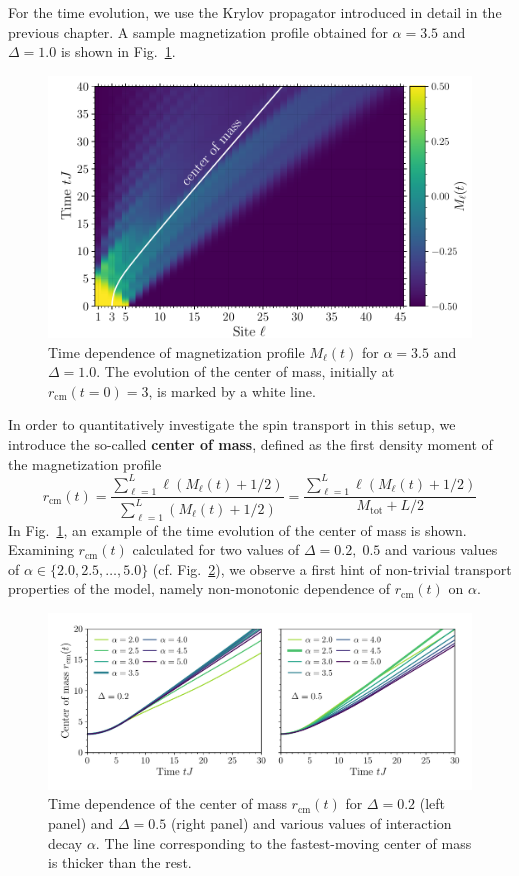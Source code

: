 For the time evolution, we use the Krylov propagator introduced in detail in the previous chapter.
A sample magnetization profile obtained for \(\alpha = 3.5\) and \(\Delta = 1.0\) is shown in
Fig.~\ref{fig:magnetization_profile}.
\begin{figure}[htbp]
  \centering
  \includegraphics[width=0.8\linewidth]{Figures/magnetization.pdf}
  \caption{Time dependence of magnetization profile \(M_{\ell}(t)\) for \(\alpha = 3.5\) and \(\Delta = 1.0\).
    The evolution of the center of mass, initially at \(r_{\text{cm}}(t=0)=3\), is marked by a white line.}
  \label{fig:magnetization_profile}
\end{figure}
In order to quantitatively investigate the spin transport in this setup, we introduce the so-called
\textbf{center of mass}, defined as the first density moment of the magnetization profile
\begin{equation}
  r_{\text{cm}}(t) = \frac{\sum_{\ell=1}^{L} \ell \left(M_{\ell}(t)+1/2\right)}
  {\sum_{\ell=1}^{L} \left(M_{\ell}(t) + 1/2\right)} =
  \frac{\sum_{\ell=1}^{L} \ell \left(M_{\ell}(t)+1/2\right)}
  {M_{\mathrm{tot}} + L/2}
  \label{eq:center_of_mass}
\end{equation}
In Fig.~\ref{fig:magnetization_profile}, an example of the time evolution of the center of mass is shown. Examining \(r_{\text{cm}}(t)\)
calculated for two values of \(\Delta = 0.2,\;0.5\) and various values of \(\alpha \in \{2.0,2.5,\ldots,5.0\}\)
(cf. Fig.~\ref{fig:center_of_mass}), we observe a first hint of non-trivial transport properties of the model, namely
non-monotonic dependence of \(r_{\text{cm}}(t)\) on \(\alpha\).
\begin{figure}[htbp]
  \centering
  \includegraphics[width=0.95\linewidth]{Figures/center_of_mass.pdf}
  \caption{Time dependence of the center of mass \(r_{\text{cm}}(t)\) for \(\Delta = 0.2\) (left panel) and \(\Delta = 0.5\)
    (right panel) and various values of interaction decay \(\alpha\). The line corresponding to the fastest-moving center of mass
    is thicker than the rest.}
  \label{fig:center_of_mass}
\end{figure}
